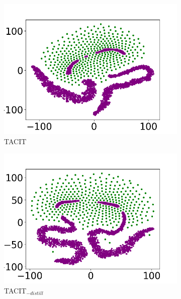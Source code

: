 \documentclass[letterpaper]{article} %
\begin{document}
\begin{figure}[t]
	\centering
	\begin{subfigure}{0.46\linewidth}
		\includegraphics[width=\linewidth]{vis-tacit.png}
		\caption{TACIT}
		\label{fig:sub1}
	\end{subfigure}
	\begin{subfigure}{0.46\linewidth}
		\includegraphics[width=\linewidth]{vis-distil.png}
		\caption{TACIT$_{-distill}$}
		\label{fig:sub2}
	\end{subfigure}
	\\
	\begin{subfigure}{0.46\linewidth}

\end{subfigure}
\end{figure}
\end{document}
